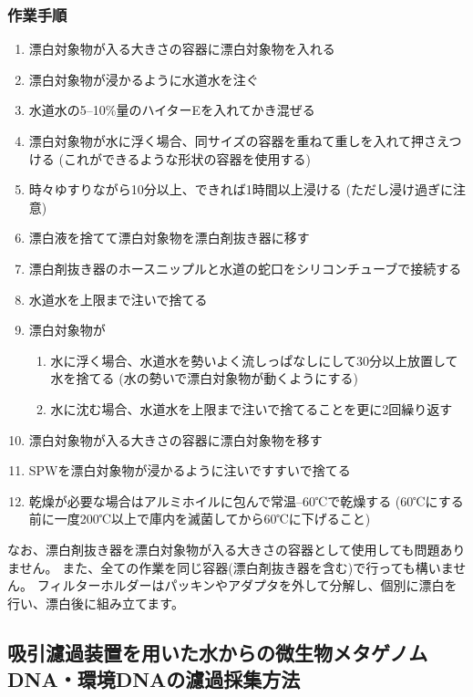 \documentclass[titlepage,10pt,a4paper]{jsbook}
\begin{document}
\subsubsection{作業手順}
\begin{enumerate}
\item 漂白対象物が入る大きさの容器に漂白対象物を入れる
\item 漂白対象物が浸かるように水道水を注ぐ
\item 水道水の5--10\%量のハイターEを入れてかき混ぜる
\item 漂白対象物が水に浮く場合、同サイズの容器を重ねて重しを入れて押さえつける (これができるような形状の容器を使用する)
\item 時々ゆすりながら10分以上、できれば1時間以上浸ける (ただし浸け過ぎに注意)
\item 漂白液を捨てて漂白対象物を漂白剤抜き器に移す
\item 漂白剤抜き器のホースニップルと水道の蛇口をシリコンチューブで接続する
\item 水道水を上限まで注いで捨てる
\item 漂白対象物が
\begin{enumerate}
\item 水に浮く場合、水道水を勢いよく流しっぱなしにして30分以上放置して水を捨てる (水の勢いで漂白対象物が動くようにする)
\item 水に沈む場合、水道水を上限まで注いで捨てることを更に2回繰り返す
\end{enumerate}
\item 漂白対象物が入る大きさの容器に漂白対象物を移す
\item SPWを漂白対象物が浸かるように注いですすいで捨てる
\item 乾燥が必要な場合はアルミホイルに包んで常温--60℃で乾燥する (60℃にする前に一度200℃以上で庫内を滅菌してから60℃に下げること)
\end{enumerate}

なお、漂白剤抜き器を漂白対象物が入る大きさの容器として使用しても問題ありません。
また、全ての作業を同じ容器(漂白剤抜き器を含む)で行っても構いません。
フィルターホルダーはパッキンやアダプタを外して分解し、個別に漂白を行い、漂白後に組み立てます。

\subsection{吸引濾過装置を用いた水からの微生物メタゲノムDNA・環境DNAの濾過採集方法}
\end{document}
